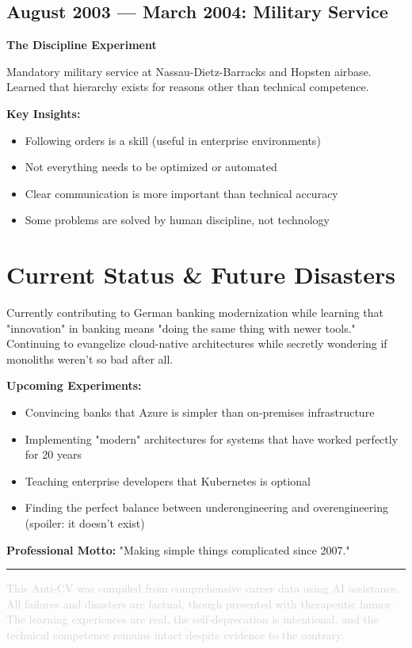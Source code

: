 \documentclass[10pt,a4paper]{article}
\begin{document}
\subsection{August 2003 — March 2004: Military Service}
\textbf{The Discipline Experiment}

Mandatory military service at Nassau-Dietz-Barracks and Hopsten airbase. Learned that hierarchy exists for reasons other than technical competence.

\textbf{Key Insights:}
\begin{itemize}[leftmargin=*,itemsep=1pt]
    \item Following orders is a skill (useful in enterprise environments)
    \item Not everything needs to be optimized or automated
    \item Clear communication is more important than technical accuracy
    \item Some problems are solved by human discipline, not technology
\end{itemize}

\section{Current Status \& Future Disasters}

Currently contributing to German banking modernization while learning that "innovation" in banking means "doing the same thing with newer tools." Continuing to evangelize cloud-native architectures while secretly wondering if monoliths weren't so bad after all.

\textbf{Upcoming Experiments:}
\begin{itemize}[leftmargin=*,itemsep=1pt]
    \item Convincing banks that Azure is simpler than on-premises infrastructure
    \item Implementing "modern" architectures for systems that have worked perfectly for 20 years
    \item Teaching enterprise developers that Kubernetes is optional
    \item Finding the perfect balance between underengineering and overengineering (spoiler: it doesn't exist)
\end{itemize}

\textbf{Professional Motto:} "Making simple things complicated since 2007."

\vspace{0.5cm}
\hrule
\vspace{0.2cm}
\textcolor{lightgray}{\footnotesize This Anti-CV was compiled from comprehensive career data using AI assistance. All failures and disasters are factual, though presented with therapeutic humor. The learning experiences are real, the self-deprecation is intentional, and the technical competence remains intact despite evidence to the contrary.}
\end{document}
